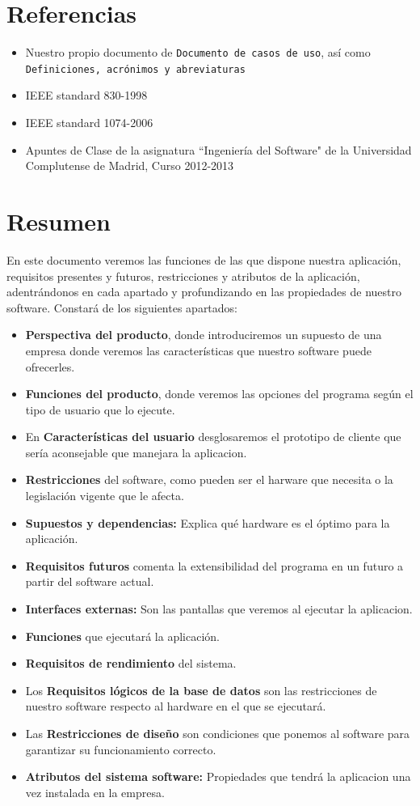 \documentclass[spanish,a4paper,11pt, twoside]{report}	%
\begin{document}
\section{Referencias}
	\begin{itemize}
		\item Nuestro propio documento de \texttt{Documento de casos de uso}, así como \\ \texttt{Definiciones, acrónimos y abreviaturas}
		\item  IEEE standard 830-1998
		\item IEEE standard 1074-2006
		\item Apuntes de Clase de la asignatura “Ingeniería del Software" de la Universidad Complutense de Madrid, Curso 2012-2013

	\end{itemize}

\section{Resumen}

En este documento veremos las funciones de las que dispone nuestra aplicación, requisitos presentes y futuros, restricciones y atributos de la aplicación, adentrándonos en cada apartado y profundizando en las propiedades de nuestro software.
Constará de los siguientes apartados:
	\begin{itemize}
		\item \textbf{Perspectiva del producto}, donde introduciremos un supuesto de una empresa donde veremos las características que nuestro software puede ofrecerles.
		\item \textbf{Funciones del producto}, donde veremos las opciones del programa según el tipo de usuario que lo ejecute.
		\item En \textbf{Características del usuario} desglosaremos el prototipo de cliente que sería aconsejable que manejara la aplicacion.
		\item \textbf{Restricciones} del software, como pueden ser el harware que necesita o la legislación vigente que le afecta.
		\item \textbf{Supuestos y dependencias:} Explica qué hardware es el óptimo para la aplicación.
		\item \textbf{Requisitos futuros} comenta la extensibilidad del programa en un futuro a partir del software actual.
		\item \textbf{Interfaces externas:} Son las pantallas que veremos al ejecutar la aplicacion.
		\item \textbf{Funciones} que ejecutará la aplicación.
		\item \textbf{Requisitos de rendimiento} del sistema.
		\item Los \textbf{Requisitos lógicos de la base de datos} son las restricciones de nuestro software respecto al hardware en el que se ejecutará.
		\item Las \textbf{Restricciones de diseño} son condiciones que ponemos al software para garantizar su funcionamiento correcto.
		\item \textbf{Atributos del sistema software:} Propiedades que tendrá la aplicacion una vez instalada en la empresa.
	\end{itemize}
\end{document}
